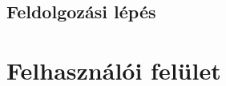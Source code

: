 \subsection{Feldolgozási lépés}\label{sect:processingStep}


\section{Felhasználói felület}\label{sect:UserInterface}


